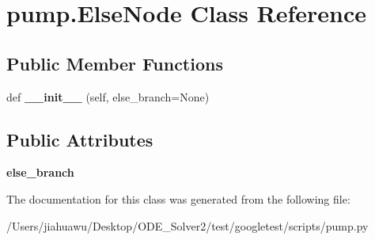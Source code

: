 \hypertarget{classpump_1_1_else_node}{}\section{pump.\+Else\+Node Class Reference}
\label{classpump_1_1_else_node}
\subsection*{Public Member Functions}
\begin{DoxyCompactItemize}
\item 
\mbox{\label{classpump_1_1_else_node_a7489ff8c6c7ddfe6bd6593b8ecccd819}} 
def {\bfseries \+\_\+\+\_\+init\+\_\+\+\_\+} (self, else\+\_\+branch=None)
\end{DoxyCompactItemize}
\subsection*{Public Attributes}
\begin{DoxyCompactItemize}
\item 
\mbox{\label{classpump_1_1_else_node_ac838a0fe9f5d713c7f56939eed5e128d}} 
{\bfseries else\+\_\+branch}
\end{DoxyCompactItemize}


The documentation for this class was generated from the following file\+:\begin{DoxyCompactItemize}
\item 
/\+Users/jiahuawu/\+Desktop/\+O\+D\+E\+\_\+\+Solver2/test/googletest/scripts/pump.\+py\end{DoxyCompactItemize}
